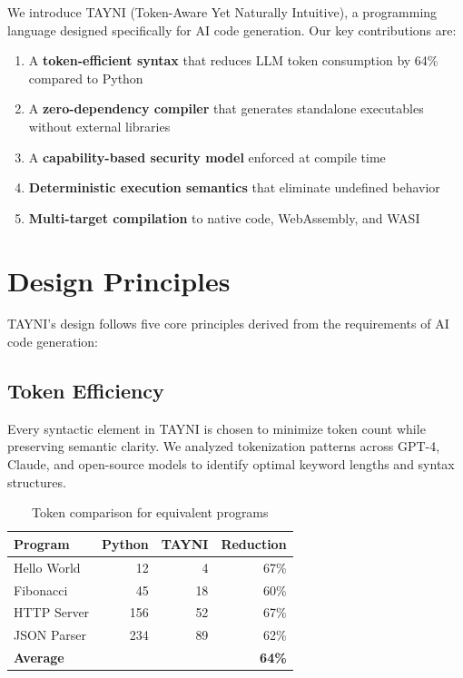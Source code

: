 \documentclass[11pt,a4paper]{article}
\begin{document}
We introduce TAYNI (Token-Aware Yet Naturally Intuitive), a programming language designed specifically for AI code generation. Our key contributions are:

\begin{enumerate}
    \item A \textbf{token-efficient syntax} that reduces LLM token consumption by 64\% compared to Python
    \item A \textbf{zero-dependency compiler} that generates standalone executables without external libraries
    \item A \textbf{capability-based security model} enforced at compile time
    \item \textbf{Deterministic execution semantics} that eliminate undefined behavior
    \item \textbf{Multi-target compilation} to native code, WebAssembly, and WASI
\end{enumerate}

\section{Design Principles}

TAYNI's design follows five core principles derived from the requirements of AI code generation:

\subsection{Token Efficiency}

Every syntactic element in TAYNI is chosen to minimize token count while preserving semantic clarity. We analyzed tokenization patterns across GPT-4, Claude, and open-source models to identify optimal keyword lengths and syntax structures.

\begin{table}[h]
\centering
\caption{Token comparison for equivalent programs}
\begin{tabular}{lrrr}
\toprule
Program & Python & TAYNI & Reduction \\
\midrule
Hello World & 12 & 4 & 67\% \\
Fibonacci & 45 & 18 & 60\% \\
HTTP Server & 156 & 52 & 67\% \\
JSON Parser & 234 & 89 & 62\% \\
\midrule
\textbf{Average} & & & \textbf{64\%} \\
\bottomrule
\end{tabular}
\label{tab:tokens}
\end{table}
\end{document}
